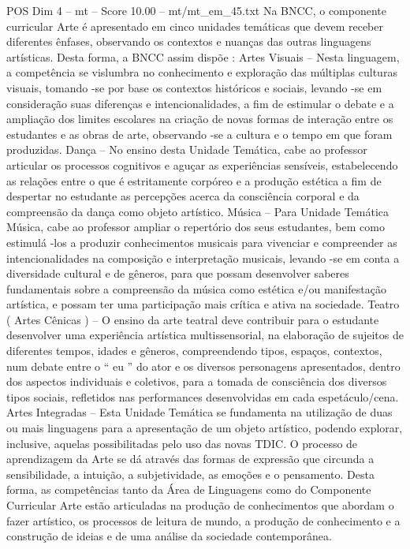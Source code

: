 \begin{textsample}{POS Dim 4 – mt – Score 10.00 – mt/mt\_em\_45.txt}
Na BNCC, o componente curricular Arte é apresentado em cinco unidades temáticas que devem receber diferentes ênfases, observando os contextos e nuanças das outras linguagens artísticas.
Desta forma, a BNCC assim dispõe : Artes Visuais – Nesta linguagem, a competência se vislumbra no conhecimento e exploração das múltiplas culturas visuais, tomando -se por base os contextos históricos e sociais, levando -se em consideração suas diferenças e intencionalidades, a fim de estimular o debate e a ampliação dos limites escolares na criação de novas formas de interação entre os estudantes e as obras de arte, observando -se a cultura e o tempo em que foram produzidas.
Dança – No ensino desta Unidade Temática, cabe ao professor articular os processos cognitivos e aguçar as experiências sensíveis, estabelecendo as relações entre o que é estritamente corpóreo e a produção estética a fim de despertar no estudante as percepções acerca da consciência corporal e da compreensão da dança como objeto artístico.
Música – Para Unidade Temática Música, cabe ao professor ampliar o repertório dos seus estudantes, bem como estimulá -los a produzir conhecimentos musicais para vivenciar e compreender as intencionalidades na composição e interpretação musicais, levando -se em conta a diversidade cultural e de gêneros, para que possam desenvolver saberes fundamentais sobre a compreensão da música como estética e/ou manifestação artística, e possam ter uma participação mais crítica e ativa na sociedade.
Teatro ( Artes Cênicas ) – O ensino da arte teatral deve contribuir para o estudante desenvolver uma experiência artística multissensorial, na elaboração de sujeitos de diferentes tempos, idades e gêneros, compreendendo tipos, espaços, contextos, num debate entre o “ eu ” do ator e os diversos personagens apresentados, dentro dos aspectos individuais e coletivos, para a tomada de consciência dos diversos tipos sociais, refletidos nas performances desenvolvidas em cada espetáculo/cena.
Artes Integradas – Esta Unidade Temática se fundamenta na utilização de duas ou mais linguagens para a apresentação de um objeto artístico, podendo explorar, inclusive, aquelas possibilitadas pelo uso das novas TDIC.
O processo de aprendizagem da Arte se dá através das formas de expressão que circunda a sensibilidade, a intuição, a subjetividade, as emoções e o pensamento.
Desta forma, as competências tanto da Área de Linguagens como do Componente Curricular Arte estão articuladas na produção de conhecimentos que abordam o fazer artístico, os processos de leitura de mundo, a produção de conhecimento e a construção de ideias e de uma análise da sociedade contemporânea.

\end{textsample}
